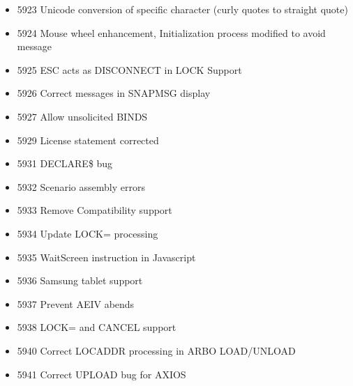 \documentclass[letterpaper,10pt,english]{sphinxmanual}
\begin{document}
\begin{itemize}
\item {} 
5923 Unicode conversion of specific character (curly quotes to straight quote)

\item {} 
5924 Mouse wheel enhancement, Initialization process modified to avoid message

\item {} 
5925 ESC acts as DISCONNECT in LOCK Support

\item {} 
5926 Correct messages in SNAPMSG display

\item {} 
5927 Allow unsolicited BINDS

\item {} 
5929 License statement corrected

\item {} 
5931 DECLARE\$ bug

\item {} 
5932 Scenario assembly errors

\item {} 
5933 Remove Compatibility support

\item {} 
5934 Update LOCK= processing

\item {} 
5935 WaitScreen instruction in Javascript

\item {} 
5936 Samsung tablet support

\item {} 
5937 Prevent AEIV abends

\item {} 
5938 LOCK= and CANCEL support

\item {} 
5940 Correct LOCADDR processing in ARBO LOAD/UNLOAD

\item {} 
5941 Correct UPLOAD bug for AXIOS

\end{itemize}



\renewcommand{\indexname}{Index}
\printindex
\end{document}
